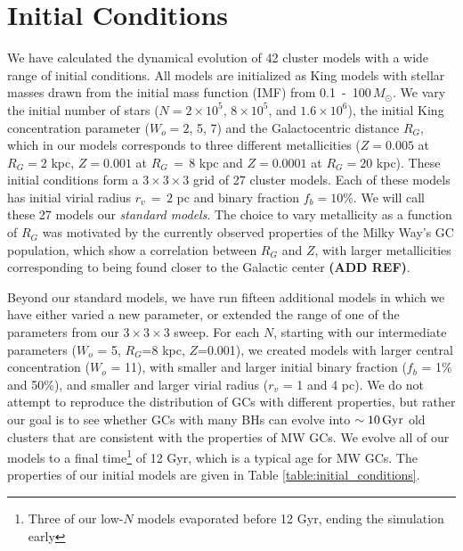 \documentclass[12pt,preprint]{aastex}
\begin{document}



\section{Initial Conditions}

We have calculated the dynamical evolution of 42 cluster models with a wide range of
initial conditions. All models are initialized as King models with stellar masses 
drawn from the \cite{Kroupa2001} initial mass function (IMF) from 
0.1 \,-\, 100$\, M_\odot$. We vary the initial number of stars 
($N=2 \times 10^5$, $8 \times 10^5$, and $1.6 \times 10^6$), the initial King 
concentration parameter ($W_o=2$, 5, 7) and the Galactocentric distance $R_G$, 
which in our models corresponds to three different metallicities
($Z=0.005$ at $R_G=2$ kpc, $Z = 0.001$ at $R_G\,=\,8$ kpc and $Z=0.0001$ at $R_G=20$ kpc). 
These initial conditions form a $3 \times 3 \times 3$ grid of 27 cluster models. 
Each of these models has initial virial radius $r_v\,=\,2$ pc and binary fraction
 $f_b = 10$\%. We will call these 27 models our \emph{standard models}.
 The choice to vary metallicity as a function of $R_G$ was 
 motivated by the currently observed properties of the Milky Way's GC population, 
 which show a correlation between $R_G$ and $Z$, with larger metallicities 
 corresponding to being found closer to the Galactic center \textbf{(ADD REF)}.

Beyond our standard models, we have run fifteen additional models
in which we have either varied a new parameter, or extended the range of one of the 
parameters from our $3\times3\times3$ sweep. For each $N$, starting with our 
intermediate parameters ($W_o$ = 5, $R_G$=8 kpc, $Z$=0.001),
we created models with larger central concentration ($W_o$ = 11), with smaller and
larger initial binary fraction ($f_b$ = 1\% and 50\%), and smaller and larger virial radius 
($r_v$ = 1 and 4 pc). We do not attempt to reproduce the distribution of GCs with 
different properties, but rather our goal is to see whether GCs with many BHs can 
evolve into $\sim 10\, \rm Gyr$ old clusters that are consistent with the properties of MW GCs. 
We evolve all of our models to a final time\footnote{Three of our low-$N$ models evaporated
before 12 Gyr, ending the simulation early} of 12 Gyr, which is a typical age for MW GCs. 
The properties of our initial models are given in Table \ref{table:initial_conditions}.
\end{document}

